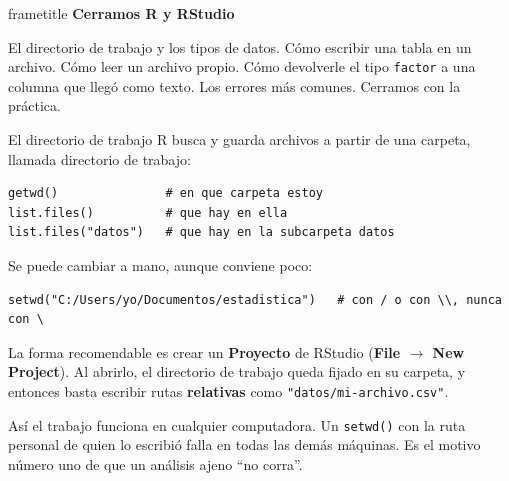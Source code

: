 \documentclass[aspectratio=169,10pt]{beamer}
\newcommand{\Rc}[1]{{\setlength{\fboxsep}{1.6pt}%
  \colorbox{codigoFondo}{\textcolor{codigoTexto}{\texttt{#1}}}}}
\newcommand{\destaca}[1]{%
  \par\vspace{3pt}\noindent
  \colorbox{azulClaro}{%
    \parbox{\dimexpr\linewidth-2\fboxsep\relax}{\vspace{3pt}#1\vspace{3pt}}}%
  \par\vspace{3pt}}
\newcommand{\hojaSesion}[2]{%
  \vfill
  \begin{beamercolorbox}[wd=\textwidth,sep=16pt,center]{frametitle}
    {\Large\bfseries #1}\\[11pt]
    \begin{minipage}{0.82\textwidth}\centering\small #2\end{minipage}
  \end{beamercolorbox}
  \vfill}
\begin{document}
\begin{frame}[plain]
  \hojaSesion{Cerramos R y RStudio}{%
  El directorio de trabajo y los tipos de datos. Cómo escribir una tabla en un
  archivo. Cómo leer un archivo propio. Cómo devolverle el tipo \texttt{factor} a una
  columna que llegó como texto. Los errores más comunes. Cerramos con la práctica.}
\end{frame}
\begin{frame}[fragile]{El directorio de trabajo}
  R busca y guarda archivos a partir de una carpeta, llamada directorio de trabajo:
\begin{lstlisting}
getwd()               # en que carpeta estoy
list.files()          # que hay en ella
list.files("datos")   # que hay en la subcarpeta datos
\end{lstlisting}
  \vspace{0.2cm}
  Se puede cambiar a mano, aunque conviene poco:
\begin{lstlisting}
setwd("C:/Users/yo/Documentos/estadistica")   # con / o con \\, nunca con \
\end{lstlisting}

  \vspace{0.2cm}
  \destaca{\small La forma recomendable es crear un \textbf{Proyecto} de RStudio
  (\textbf{File $\rightarrow$ New Project}). Al abrirlo, el directorio de trabajo
  queda fijado en su carpeta, y entonces basta escribir rutas
  \textbf{relativas} como \Rc{"datos/mi-archivo.csv"}.
  
  \vspace{0.2cm}
  Así el trabajo funciona en cualquier computadora. Un \Rc{setwd()} con la ruta
  personal de quien lo escribió falla en todas las demás máquinas. Es el motivo
  número uno de que un análisis ajeno ``no corra''.}
\end{frame}
\end{document}
